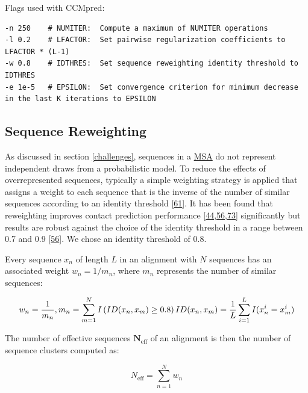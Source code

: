 \documentclass[12pt,a4paper,twoside]{book}
\newcommand{\neff}{N_\mathrm{eff}}
\theoremstyle{definition}
\theoremstyle{definition}
\theoremstyle{remark}
\begin{document}
Flags used with CCMpred:

\begin{verbatim}
-n 250    # NUMITER:  Compute a maximum of NUMITER operations
-l 0.2    # LFACTOR:  Set pairwise regularization coefficients to LFACTOR * (L-1) 
-w 0.8    # IDTHRES:  Set sequence reweighting identity threshold to IDTHRES
-e 1e-5   # EPSILON:  Set convergence criterion for minimum decrease in the last K iterations to EPSILON
\end{verbatim}

\subsection{Sequence Reweighting}\label{seq-reweighting}

As discussed in section \ref{challenges}, sequences in a
\protect\hyperlink{abbrev}{MSA} do not represent independent draws from
a probabilistic model. To reduce the effects of overrepresented
sequences, typically a simple weighting strategy is applied that assigns
a weight to each sequence that is the inverse of the number of similar
sequences according to an identity threshold
{[}\protect\hyperlink{ref-Stein2015a}{61}{]}. It has been found that
reweighting improves contact prediction performance
{[}\protect\hyperlink{ref-Jones2012}{44},\protect\hyperlink{ref-Morcos2011}{56},\protect\hyperlink{ref-Buslje2009}{73}{]}
significantly but results are robust against the choice of the identity
threshold in a range between 0.7 and 0.9
{[}\protect\hyperlink{ref-Morcos2011}{56}{]}. We chose an identity
threshold of 0.8.

Every sequence \(x_n\) of length \(L\) in an alignment with \(N\)
sequences has an associated weight \(w_n = 1/m_n\), where \(m_n\)
represents the number of similar sequences:

\begin{equation} 
  w_n = \frac{1}{m_n}, m_n = \sum_{m=1}^N I \left( ID(x_n, x_m) \geq 0.8 \right) \\
  ID(x_n, x_m)=\frac{1}{L} \sum_{i=1}^L I(x_n^i = x_m^i)
  \label{eq:seqweight}
\end{equation}

The number of effective sequences \(\mathbf{\neff}\) of an alignment is
then the number of sequence clusters computed as:

\begin{equation} 
  \neff = \sum_{n=1}^N w_n
  \label{eq:neff}
\end{equation}
\end{document}
